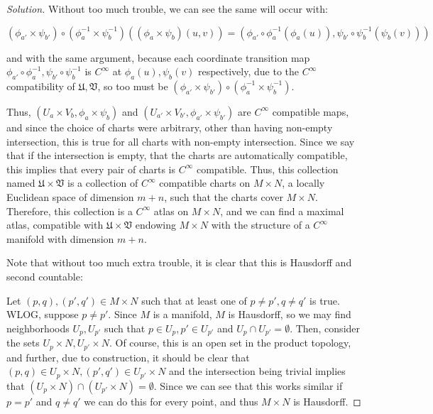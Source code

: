 \documentclass[10pt]{article}
\begin{document}
\begin{proof}[Solution]
Without too much trouble, we can see the same will occur with:

$$ (\phi_{a'} \times \psi_{b'}) \circ (\phi_a^{-1} \times \psi_b^{-1}) ((\phi_a \times \psi_b)(u,v)) =  (\phi_{a'} \circ \phi_{a}^{-1} (\phi_{a}(u)), \psi_{b'} \circ \psi_{b}^{-1}(\psi_{b}(v)))$$

and with the same argument, because each coordinate transition map $\phi_{a'} \circ \phi_{a}^{-1}, \psi_{b'} \circ \psi_{b}^{-1}$ is $C^\infty$ at $\phi_{a}(u), \psi_{b}(v)$ respectively, due to the $C^\infty$ compatibility of $\mathfrak{U}, \mathfrak{V}$, so too must be $(\phi_{a'} \times \psi_{b'}) \circ (\phi_a^{-1} \times \psi_b^{-1})$. 

Thus, $(U_a \times V_b, \phi_a \times \psi_b)$ and $(U_{a'} \times V_{b'}, \phi_{a'} \times \psi_{b'}) $ are $C^\infty$ compatible maps, and since the choice of charts were arbitrary, other than having non-empty intersection, this is true for all charts with non-empty intersection. Since we say that if the intersection is empty, that the charts are automatically compatible, this implies that every pair of charts is $C^\infty$ compatible. Thus, this collection named $\mathfrak{U} \times \mathfrak{V}$ is a collection of $C^\infty$ compatible charts on $M \times N$, a locally Euclidean space of dimension $m+n$, such that the charts cover $M \times N$. Therefore, this collection is a $C^\infty$ atlas on $M \times N$, and we can find a maximal atlas, compatible with $\mathfrak{U} \times \mathfrak{V}$ endowing $M \times N$ with the structure of a $C^\infty$ manifold with dimension $m+n$.



Note that without too much extra trouble, it is clear that this is Hausdorff and second countable:

Let $(p,q), (p',q') \in M \times N$ such that at least one of $p \not = p', q \not = q'$ is true. WLOG, suppose $p \not = p'$. Since $M$ is a manifold, $M$ is Hausdorff, so we may find neighborhoods $U_p, U_{p'}$ such that $p \in U_p, p' \in U_{p'}$ and $U_p \cap U_{p'} = \emptyset$. Then, consider the sets $U_p \times N, U_{p'} \times N$. Of course, this is an open set in the product topology, and further, due to construction, it should be clear that $(p,q) \in U_p \times N, (p',q') \in U_{p'} \times N$ and the intersection being trivial implies that $(U_p \times N) \cap (U_{p'} \times N) = \emptyset$. Since we can see that this works similar if $p = p'$ and $q \not = q'$ we can do this for every point, and thus $M \times N$ is Hausdorff.


\end{proof}
\end{document}
